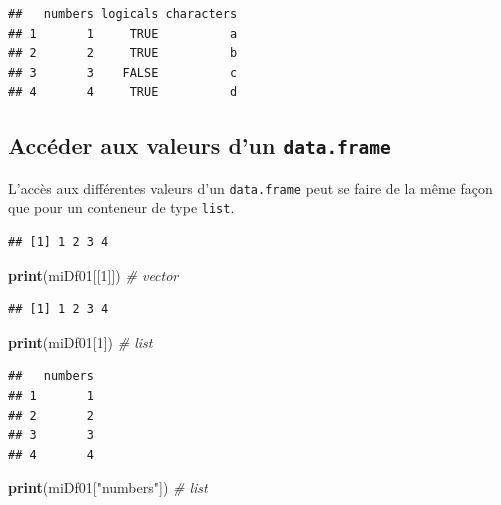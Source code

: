 \documentclass[
]{book}
\newenvironment{Shaded}{\begin{snugshade}}{\end{snugshade}}
\newcommand{\CommentTok}[1]{\textcolor[rgb]{0.56,0.35,0.01}{\textit{#1}}}
\newcommand{\DecValTok}[1]{\textcolor[rgb]{0.00,0.00,0.81}{#1}}
\newcommand{\KeywordTok}[1]{\textcolor[rgb]{0.13,0.29,0.53}{\textbf{#1}}}
\newcommand{\NormalTok}[1]{#1}
\newcommand{\OperatorTok}[1]{\textcolor[rgb]{0.81,0.36,0.00}{\textbf{#1}}}
\newcommand{\StringTok}[1]{\textcolor[rgb]{0.31,0.60,0.02}{#1}}
\begin{document}
\begin{verbatim}
##   numbers logicals characters
## 1       1     TRUE          a
## 2       2     TRUE          b
## 3       3    FALSE          c
## 4       4     TRUE          d
\end{verbatim}

\hypertarget{accuxe9der-aux-valeurs-dun-data.frame}{%
\subsection{\texorpdfstring{Accéder aux valeurs d'un \texttt{data.frame}}{Accéder aux valeurs d'un data.frame}}\label{accuxe9der-aux-valeurs-dun-data.frame}}

L'accès aux différentes valeurs d'un \texttt{data.frame} peut se faire de la même façon que pour un conteneur de type \texttt{list}.

\begin{Shaded}
\end{Shaded}

\begin{verbatim}
## [1] 1 2 3 4
\end{verbatim}

\begin{Shaded}
\begin{Highlighting}[]
\KeywordTok{print}\NormalTok{(miDf01[[}\DecValTok{1}\NormalTok{]]) }\CommentTok{# vector}
\end{Highlighting}
\end{Shaded}

\begin{verbatim}
## [1] 1 2 3 4
\end{verbatim}

\begin{Shaded}
\begin{Highlighting}[]
\KeywordTok{print}\NormalTok{(miDf01[}\DecValTok{1}\NormalTok{]) }\CommentTok{# list}
\end{Highlighting}
\end{Shaded}

\begin{verbatim}
##   numbers
## 1       1
## 2       2
## 3       3
## 4       4
\end{verbatim}

\begin{Shaded}
\begin{Highlighting}[]
\KeywordTok{print}\NormalTok{(miDf01[}\StringTok{"numbers"}\NormalTok{]) }\CommentTok{# list}
\end{Highlighting}
\end{Shaded}
\end{document}
